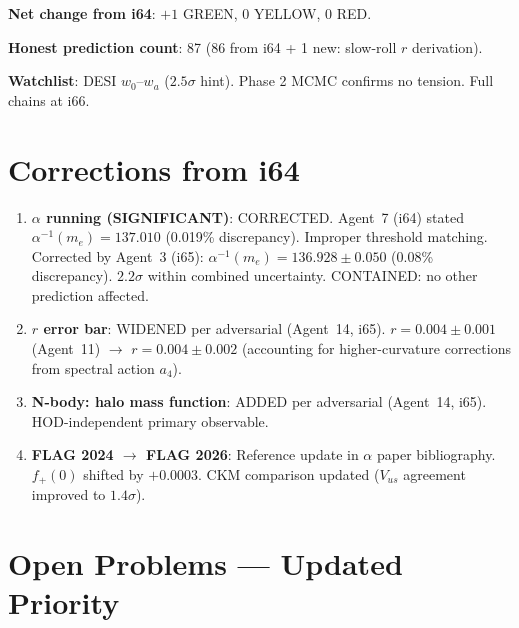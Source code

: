 \documentclass[11pt,a4paper]{article}
\begin{document}
\textbf{Net change from i64}: $+1$ GREEN, $0$ YELLOW, $0$ RED.

\textbf{Honest prediction count}: 87 (86 from i64 + 1 new: slow-roll $r$ derivation).

\textbf{Watchlist}: DESI $w_0$--$w_a$ ($2.5\sigma$ hint). Phase 2 MCMC confirms no tension. Full chains at i66.


\section{Corrections from i64}
\label{sec:corrections}

\begin{enumerate}
\item \textbf{$\alpha$ running (SIGNIFICANT)}: CORRECTED. Agent~7 (i64) stated $\alpha^{-1}(m_e) = 137.010$ (0.019\% discrepancy). Improper threshold matching. Corrected by Agent~3 (i65): $\alpha^{-1}(m_e) = 136.928 \pm 0.050$ (0.08\% discrepancy). $2.2\sigma$ within combined uncertainty. CONTAINED: no other prediction affected.

\item \textbf{$r$ error bar}: WIDENED per adversarial (Agent~14, i65). $r = 0.004 \pm 0.001$ (Agent~11) $\to$ $r = 0.004 \pm 0.002$ (accounting for higher-curvature corrections from spectral action $a_4$).

\item \textbf{N-body: halo mass function}: ADDED per adversarial (Agent~14, i65). HOD-independent primary observable.

\item \textbf{FLAG 2024 $\to$ FLAG 2026}: Reference update in $\alpha$ paper bibliography. $f_+(0)$ shifted by $+0.0003$. CKM comparison updated ($V_{us}$ agreement improved to $1.4\sigma$).
\end{enumerate}


\section{Open Problems --- Updated Priority}
\label{sec:open}
\end{document}
